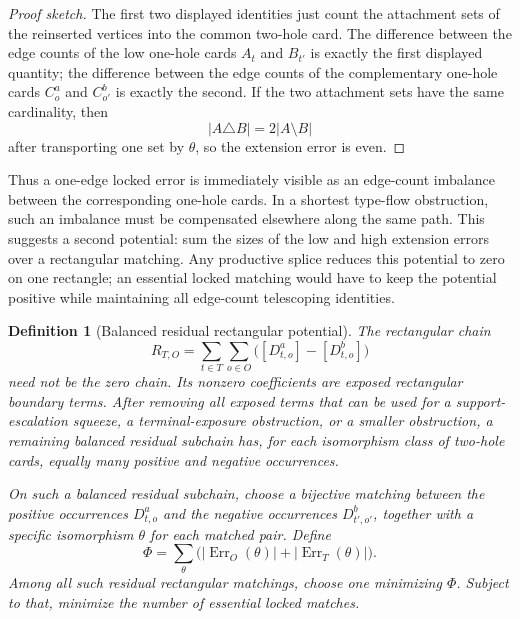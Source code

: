\documentclass[11pt]{article}
\newtheorem{definition}{Definition}
\newcommand{\Err}{\operatorname{Err}}
\begin{document}
\begin{proof}[Proof sketch]
The first two displayed identities just count the attachment sets of the
reinserted vertices into the common two-hole card.  The difference between
the edge counts of the low one-hole cards \(A_t\) and \(B_{t'}\) is exactly
the first displayed quantity; the difference between the edge counts of the
complementary one-hole cards \(C_o^a\) and \(C_{o'}^b\) is exactly the
second.  If the two attachment sets have the same cardinality, then
\[
  |A\triangle B|=2|A\setminus B|
\]
after transporting one set by \(\theta\), so the extension error is even.
\end{proof}

Thus a one-edge locked error is immediately visible as an edge-count
imbalance between the corresponding one-hole cards.  In a shortest type-flow
obstruction, such an imbalance must be compensated elsewhere along the same
path.  This suggests a second potential: sum the sizes of the low and high
extension errors over a rectangular matching.  Any productive splice reduces
this potential to zero on one rectangle; an essential locked matching would
have to keep the potential positive while maintaining all edge-count
telescoping identities.

\begin{definition}[Balanced residual rectangular potential]
The rectangular chain
\[
  R_{T,O}
  =
  \sum_{t\in T}\sum_{o\in O}
    \bigl([D_{t,o}^a]-[D_{t,o}^b]\bigr)
\]
need not be the zero chain.  Its nonzero coefficients are exposed
rectangular boundary terms.  After removing all exposed terms that can be
used for a support-escalation squeeze, a terminal-exposure obstruction, or a
smaller obstruction, a remaining balanced residual subchain has, for each
isomorphism class of two-hole cards, equally many positive and negative
occurrences.

On such a balanced residual subchain, choose a bijective matching between
the positive occurrences \(D_{t,o}^a\) and the negative occurrences
\(D_{t',o'}^b\), together with a specific isomorphism \(\theta\) for each
matched pair.  Define
\[
  \Phi
  =
  \sum_{\theta}
    \bigl(|\Err_O(\theta)|+|\Err_T(\theta)|\bigr).
\]
Among all such residual rectangular matchings, choose one minimizing
\(\Phi\).  Subject to that, minimize the number of essential locked matches.
\end{definition}
\end{document}

